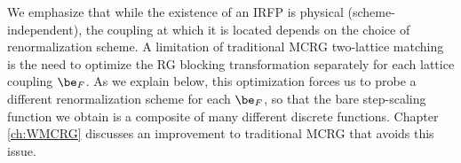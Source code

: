 We emphasize that while the existence of an IRFP is physical (scheme-independent), the coupling at which it is located depends on the choice of renormalization scheme.
A limitation of traditional MCRG two-lattice matching is the need to optimize the RG blocking transformation separately for each lattice coupling $\be_F$.
As we explain below, this optimization forces us to probe a different renormalization scheme for each $\be_F$, so that the bare step-scaling function we obtain is a composite of many different discrete \be functions.
Chapter \ref{ch:WMCRG} discusses an improvement to traditional MCRG that avoids this issue.


